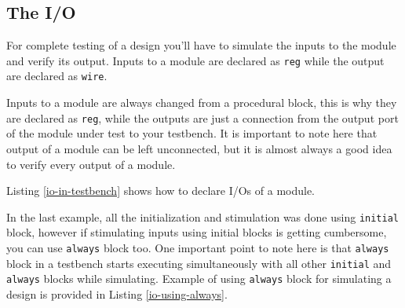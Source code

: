 \documentclass[a4paper,10pt]{article}
\theoremstyle{mytheor}
\newcommand{
  \insertverilog}[3]{
  
}
\begin{document}
\subsection{The I/O}
For complete testing of a design you'll have to simulate the inputs to
the module and verify its output. Inputs to a module are declared as
\lstinline[style=verilog-inline-style]{reg} while the output are
declared as \lstinline[style=verilog-inline-style]{wire}.

Inputs to a module are always changed from a procedural block, this is
why they are declared as \lstinline[style=verilog-inline-style]{reg},
while the outputs are just a connection from the output port of the
module under test to your testbench. It is important to note here that
output of a module can be left unconnected, but it is almost always a
good idea to verify every output of a module.

Listing \ref{io-in-testbench} shows how to declare I/Os of a module.
\insertverilog
    {./verilog_files/iosInTestbench.v}
    {io-in-testbench}
    {\text{Example code showing how to initialize and read I/Os of a module.}}

In the last example, all the initialization and stimulation was done
using \lstinline[style=verilog-inline-style]{initial} block, however
if stimulating inputs using initial blocks is getting cumbersome, you
can use \lstinline[style=verilog-inline-style]{always} block too. One
important point to note here is that
\lstinline[style=verilog-inline-style]{always} block in a testbench
starts executing simultaneously with all other
\lstinline[style=verilog-inline-style]{initial} and
\lstinline[style=verilog-inline-style]{always} blocks while
simulating. Example of using \lstinline[style=verilog-inline-style]{always} block for simulating a design is provided in Listing \ref{io-using-always}.

\insertverilog
    {./verilog_files/ioUsingAlways.v}
    {io-using-always}
    {\text{This listing shows how to use always block for simulating inputs to a module.}}
\end{document}
